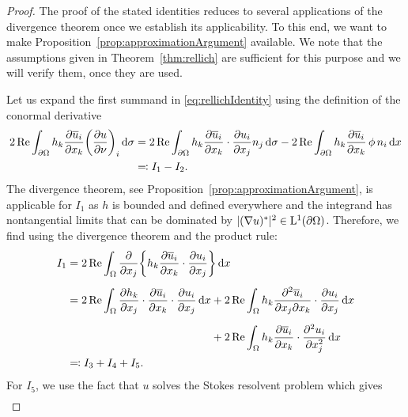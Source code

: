\begin{proof}
  The proof of the stated identities reduces to several applications of the divergence theorem once we establish its applicability.
  To this end, we want to make Proposition~\ref{prop:approximationArgument} available. We note that the assumptions given in Theorem~\ref{thm:rellich} are sufficient for this purpose and we will verify them, once they are used.

  Let us expand the first summand in \eqref{eq:rellichIdentity} using the definition of the conormal derivative
  \begin{align*}
    2\operatorname{Re} \int_{\partial\Omega} h_k \frac{\partial \overline u_i}{\partial x_k} \bigg( \frac{\partial u}{\partial \nu} \bigg)_i \, {\operatorname{d}\!{\sigma}}
    &= 2 \operatorname{Re} \int_{\partial\Omega} h_k \frac{\partial \overline u_i}{\partial x_k} \cdot \frac{\partial u_i}{\partial x_j}  n_j \, {\operatorname{d}\!{\sigma}}  - 2\operatorname{Re} \int_{\partial\Omega} h_k \frac{\partial \overline u_i}{\partial x_k} \, \phi\, n_i \, {\operatorname{d}\!{x}} \\
    &\eqqcolon I_1 - I_2.
  \end{align*}
  The divergence theorem, see Proposition~\ref{prop:approximationArgument}, is applicable for $I_1$ as $h$ is bounded and defined everywhere and the integrand has nontangential limits that can be dominated by $|(\nabla u)^*|^2 \in \mathrm{L}^1(\partial\Omega)$.
  Therefore, we find using the divergence theorem and the product rule:
  \begin{align*}
    I_1
    &= 2\Ret \int_\Omega \frac{\partial}{\partial x_j} \bigg\{ h_k \frac{\partial \overline u_i}{\partial x_k} \cdot \frac{\partial u_i}{\partial x_j} \bigg\} \d x \\[0.5em]
    &= 2\Ret \int_\Omega \frac{\partial h_k}{\partial x_j} \cdot \frac{\partial \overline u_i}{\partial x_k} \cdot \frac{\partial u_i}{\partial x_j} \d x 
    + 2\Ret \int_{\Omega} h_k \frac{\partial^2 \overline u_i}{\partial x_j \partial x_k} \cdot \frac{\partial u_i}{\partial x_j} \d x  \\[0.5em]
    &\hphantom{= 2\Ret \int_\Omega \frac{\partial h_k}{\partial x_j} \cdot \frac{\partial \overline u_i}{\partial x_k} \cdot \frac{\partial u_i}{\partial x_j} \d x } \;
    + 2 \Ret \int_\Omega h_k \frac{\partial \overline u_i}{\partial x_k} \cdot \frac{\partial^2 u_i}{\partial x_j^2} \d x \\
    &\eqqcolon I_3 + I_4 + I_5.
  \end{align*}
  For $I_5$, we use the fact that $u$ solves the Stokes resolvent problem which gives
  \begin{align*}

\end{align*}
\end{proof}

